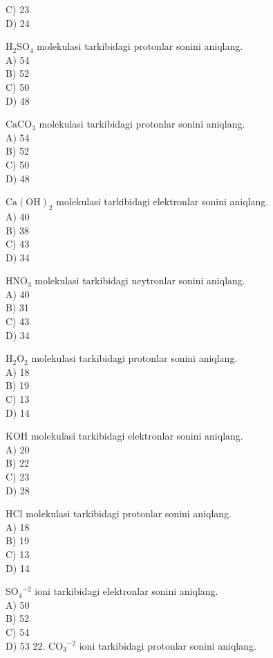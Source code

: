 C) 23\\
D) 24
  \item $\mathrm{H}_{2} \mathrm{SO}_{4}$ molekulasi tarkibidagi protonlar sonini aniqlang.\\
A) 54\\
B) 52\\
C) 50\\
D) 48
  \item $\mathrm{CaCO}_{3}$ molekulasi tarkibidagi protonlar sonini aniqlang.\\
A) 54\\
B) 52\\
C) 50\\
D) 48
  \item $\mathrm{Ca}(\mathrm{OH})_{2}$ molekulasi tarkibidagi elektronlar sonini aniqlang.\\
A) 40\\
B) 38\\
C) 43\\
D) 34
  \item $\mathrm{HNO}_{3}$ molekulasi tarkibidagi neytronlar sonini aniqlang.\\
A) 40\\
B) 31\\
C) 43\\
D) 34
  \item $\mathrm{H}_{2} \mathrm{O}_{2}$ molekulasi tarkibidagi protonlar sonini aniqlang.\\
A) 18\\
B) 19\\
C) 13\\
D) 14
  \item KOH molekulasi tarkibidagi elektronlar sonini aniqlang.\\
A) 20\\
B) 22\\
C) 23\\
D) 28
  \item HCl molekulasi tarkibidagi protonlar sonini aniqlang.\\
A) 18\\
B) 19\\
C) 13\\
D) 14
  \item $\mathrm{SO}_{4}{ }^{-2}$ ioni tarkibidagi elektronlar sonini aniqlang.\\
A) 50\\
B) 52\\
C) 54\\
D) 53
22. $\mathrm{CO}_{3}{ }^{-2}$ ioni tarkibidagi protonlar sonini aniqlang.\\
